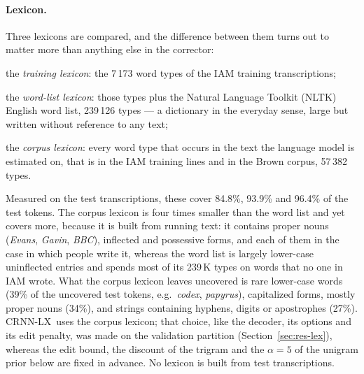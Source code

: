 \documentclass{ws-ijprai}
\newcommand{\ours}{CRNN-LX}            %
\begin{document}
\paragraph{Lexicon.}
Three lexicons are compared, and the difference between them turns out to
matter more than anything else in the corrector:

\begin{itemlist}
  \item the \emph{training lexicon}: the 7\,173 word types of the IAM
        training transcriptions;
  \item the \emph{word-list lexicon}: those types plus the Natural Language
        Toolkit (NLTK) English word list, 239\,126 types --- a dictionary in
        the everyday sense, large but written without reference to any text;
  \item the \emph{corpus lexicon}: every word type that occurs in the text
        the language model is estimated on, that is in the IAM training lines
        and in the Brown corpus, 57\,382 types.
\end{itemlist}

Measured on the test transcriptions, these cover 84.8\%, 93.9\% and 96.4\%
of the test tokens. The corpus lexicon is four times smaller than the word
list and yet covers more, because it is built from running text: it contains
proper nouns (\emph{Evans}, \emph{Gavin}, \emph{BBC}), inflected and
possessive forms, and each of them in the case in which people write it,
whereas the word list is largely lower-case uninflected entries and spends
most of its 239\,K types on words that no one in IAM wrote. What the corpus
lexicon leaves uncovered is rare lower-case words (39\% of the uncovered test
tokens, e.g.\ \emph{codex}, \emph{papyrus}), capitalized forms, mostly proper
nouns (34\%), and strings containing hyphens, digits or apostrophes (27\%). \ours\ uses the corpus
lexicon; that choice, like the decoder, its options and its edit penalty, was
made on the validation partition (Section~\ref{sec:res-lex}), whereas the
edit bound, the discount of the trigram and the $\alpha=5$ of the unigram
prior below are fixed in advance. No lexicon is built from test
transcriptions.
\end{document}
